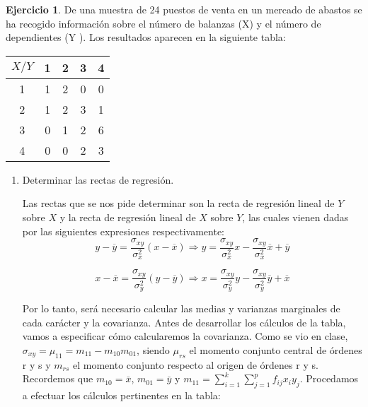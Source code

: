 \documentclass[a4paper, 12pt]{article}
\theoremstyle{definition}
\newtheorem{ej}{Ejercicio}
\begin{document}
\begin{ej}
De una muestra de 24 puestos de venta en un mercado de abastos se ha recogido información
sobre el número de balanzas (X) y el número de dependientes (Y ). Los resultados aparecen en
la siguiente tabla:

\begin{center}
\begin{tabular}{c|cccc}
	\(X/Y\) & 1 & 2 & 3 & 4 \\
	\hline
	1 & 1 & 2 & 0 & 0 \\
	2 & 1 & 2 & 3 & 1 \\
	3 & 0 & 1 & 2 & 6 \\
	4 & 0 & 0 & 2 & 3 \\
\end{tabular}
\end{center}

\begin{enumerate}[label=\alph*)]
\item Determinar las rectas de regresión.

Las rectas que se nos pide determinar son la recta de regresión lineal de \(Y\) sobre \(X\) y la recta de regresión lineal de \(X\) sobre \(Y\), las cuales vienen dadas por las siguientes expresiones respectivamente:
\[
	y - \overline{y}  =\frac{\sigma_{xy}}{\sigma_x^2} (x - \overline{x}) \Rightarrow y = \frac{\sigma_{xy}}{\sigma_x^2}x - \frac{\sigma_{xy}}{\sigma_x^2} \overline{x} + \overline{y}
\]

\[
	x - \overline{x}  =\frac{\sigma_{xy}}{\sigma_y^2} (y - \overline{y}) \Rightarrow x = \frac{\sigma_{xy}}{\sigma_y^2}y - \frac{\sigma_{xy}}{\sigma_y^2} \overline{y} + \overline{x}
\]

Por lo tanto, será necesario calcular las medias y varianzas marginales de cada carácter y la covarianza. Antes de desarrollar los cálculos de la tabla, vamos a especificar cómo calcularemos la covarianza. Como se vio en clase, $\sigma_{xy} = \mu_{11} = m_{11} -m_{10} m_{01}$, siendo $\mu_{rs}$ el momento conjunto central de órdenes r y s y $m_{rs}$ el momento conjunto respecto al origen de órdenes r y s. Recordemos que $m_{10} = \bar{x}$, $m_{01} = \bar{y}$ y $m_{11} = \sum_{i=1}^{k}\sum_{j=1}^{p}f_{ij}x_i y_j$. Procedamos a efectuar los cálculos pertinentes en la tabla:


\end{enumerate}
\end{ej}
\end{document}
